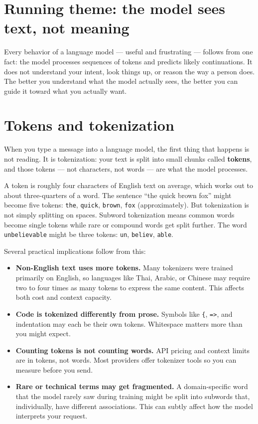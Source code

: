 \section*{Running theme: the model sees text, not meaning}

Every behavior of a language model --- useful and frustrating --- follows from one fact: the model processes sequences of tokens and predicts likely continuations. It does not understand your intent, look things up, or reason the way a person does. The better you understand what the model actually sees, the better you can guide it toward what you actually want.

\section{Tokens and tokenization}

When you type a message into a language model, the first thing that happens is not reading. It is tokenization: your text is split into small chunks called \textbf{tokens}, and those tokens --- not characters, not words --- are what the model processes.

A token is roughly four characters of English text on average, which works out to about three-quarters of a word. The sentence ``the quick brown fox'' might become five tokens: \texttt{the}, \texttt{quick}, \texttt{brown}, \texttt{fox} (approximately). But tokenization is not simply splitting on spaces. Subword tokenization means common words become single tokens while rare or compound words get split further. The word \texttt{unbelievable} might be three tokens: \texttt{un}, \texttt{believ}, \texttt{able}.

Several practical implications follow from this:

\begin{itemize}[noitemsep,topsep=0pt]
  \item \textbf{Non-English text uses more tokens.} Many tokenizers were trained primarily on English, so languages like Thai, Arabic, or Chinese may require two to four times as many tokens to express the same content. This affects both cost and context capacity.
  \item \textbf{Code is tokenized differently from prose.} Symbols like \texttt{\{}, \texttt{=>}, and indentation may each be their own tokens. Whitespace matters more than you might expect.
  \item \textbf{Counting tokens is not counting words.} API pricing and context limits are in tokens, not words. Most providers offer tokenizer tools so you can measure before you send.
  \item \textbf{Rare or technical terms may get fragmented.} A domain-specific word that the model rarely saw during training might be split into subwords that, individually, have different associations. This can subtly affect how the model interprets your request.
\end{itemize}


